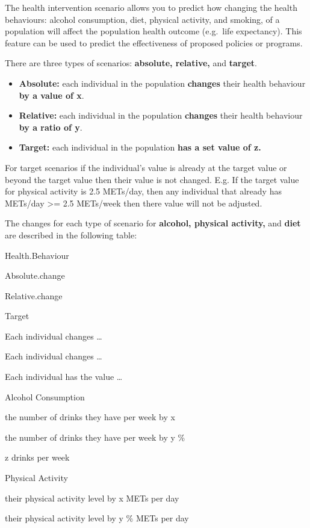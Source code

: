 \documentclass[]{book}
\providecommand{\tightlist}{%
  \setlength{\itemsep}{0pt}\setlength{\parskip}{0pt}}
\begin{document}
The health intervention scenario allows you to predict how changing the
health behaviours: alcohol consumption, diet, physical activity, and
smoking, of a population will affect the population health outcome
(e.g.~life expectancy). This feature can be used to predict the
effectiveness of proposed policies or programs.

There are three types of scenarios: \textbf{absolute, relative,} and
\textbf{target}.

\begin{itemize}
\tightlist
\item
  \textbf{Absolute:} each individual in the population \textbf{changes}
  their health behaviour \textbf{by a value of x}.
\item
  \textbf{Relative:} each individual in the population \textbf{changes}
  their health behaviour \textbf{by a ratio of y}.
\item
  \textbf{Target:} each individual in the population \textbf{has a set
  value of z.}
\end{itemize}

For target scenarios if the individual's value is already at the target
value or beyond the target value then their value is not changed. E.g.
If the target value for physical activity is 2.5 METs/day, then any
individual that already has METs/day \textgreater{}= 2.5 METs/week then
there value will not be adjusted.

The changes for each type of scenario for \textbf{alcohol, physical
activity,} and \textbf{diet} are described in the following table:

Health.Behaviour

Absolute.change

Relative.change

Target

Each individual changes \ldots{}

Each individual changes \ldots{}

Each individual has the value \ldots{}

Alcohol Consumption

the number of drinks they have per week by x

the number of drinks they have per week by y \%

z drinks per week

Physical Activity

their physical activity level by x METs per day

their physical activity level by y \% METs per day
\end{document}
